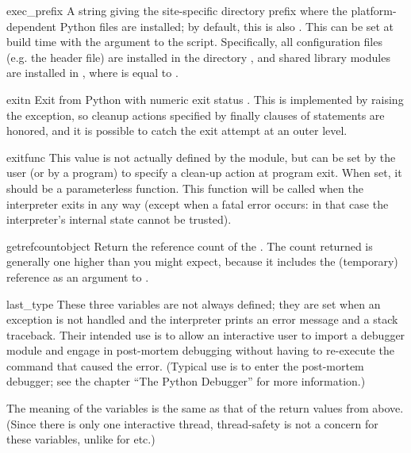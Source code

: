 \begin{datadesc}{exec_prefix}
A string giving the site-specific
directory prefix where the platform-dependent Python files are
installed; by default, this is also .  This can be
set at build time with the  argument to the
 script.  Specifically, all configuration files
(e.g. the  header file) are installed in the directory
, and shared library
modules are installed in
,
where  is equal to .
\end{datadesc}

\begin{funcdesc}{exit}{n}
  Exit from Python with numeric exit status .  This is
  implemented by raising the  exception, so cleanup
  actions specified by finally clauses of  statements
  are honored, and it is possible to catch the exit attempt at an outer
  level.
\end{funcdesc}

\begin{datadesc}{exitfunc}
  This value is not actually defined by the module, but can be set by
  the user (or by a program) to specify a clean-up action at program
  exit.  When set, it should be a parameterless function.  This function
  will be called when the interpreter exits in any way (except when a
  fatal error occurs: in that case the interpreter's internal state
  cannot be trusted).
\end{datadesc}

\begin{funcdesc}{getrefcount}{object}
Return the reference count of the .  The count returned is
generally one higher than you might expect, because it includes the
(temporary) reference as an argument to .
\end{funcdesc}

\begin{datadesc}{last_type}
These three variables are not always defined; they are set when an
exception is not handled and the interpreter prints an error message
and a stack traceback.  Their intended use is to allow an interactive
user to import a debugger module and engage in post-mortem debugging
without having to re-execute the command that caused the error.
(Typical use is  to enter the post-mortem
debugger; see the chapter ``The Python Debugger'' for more
information.)

The meaning of the variables is the same
as that of the return values from  above.
(Since there is only one interactive thread, thread-safety is not a
concern for these variables, unlike for  etc.)
\end{datadesc}

